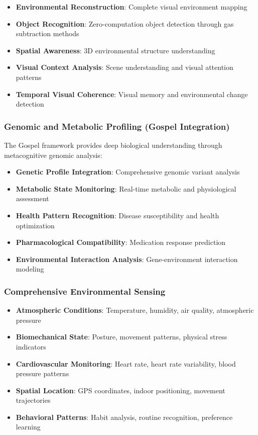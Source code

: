 \documentclass[12pt,a4paper]{article}
\begin{document}
\begin{itemize}
\item \textbf{Environmental Reconstruction}: Complete visual environment mapping
\item \textbf{Object Recognition}: Zero-computation object detection through gas subtraction methods
\item \textbf{Spatial Awareness}: 3D environmental structure understanding
\item \textbf{Visual Context Analysis}: Scene understanding and visual attention patterns
\item \textbf{Temporal Visual Coherence}: Visual memory and environmental change detection
\end{itemize}

\subsubsection{Genomic and Metabolic Profiling (Gospel Integration)}

The Gospel framework provides deep biological understanding through metacognitive genomic analysis:

\begin{itemize}
\item \textbf{Genetic Profile Integration}: Comprehensive genomic variant analysis
\item \textbf{Metabolic State Monitoring}: Real-time metabolic and physiological assessment
\item \textbf{Health Pattern Recognition}: Disease susceptibility and health optimization
\item \textbf{Pharmacological Compatibility}: Medication response prediction
\item \textbf{Environmental Interaction Analysis}: Gene-environment interaction modeling
\end{itemize}

\subsubsection{Comprehensive Environmental Sensing}

\begin{itemize}
\item \textbf{Atmospheric Conditions}: Temperature, humidity, air quality, atmospheric pressure
\item \textbf{Biomechanical State}: Posture, movement patterns, physical stress indicators
\item \textbf{Cardiovascular Monitoring}: Heart rate, heart rate variability, blood pressure patterns
\item \textbf{Spatial Location}: GPS coordinates, indoor positioning, movement trajectories
\item \textbf{Behavioral Patterns}: Habit analysis, routine recognition, preference learning
\end{itemize}
\end{document}
